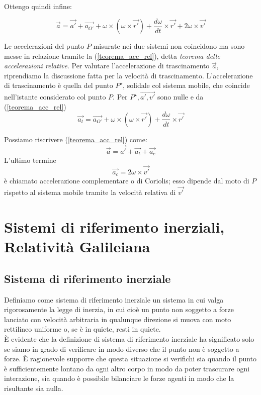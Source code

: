\documentclass[class=book, crop=false, oneside, 12pt]{standalone}
\begin{document}
Ottengo quindi infine:

\begin{equation}
    \overrightarrow{a} = \overrightarrow{a'} + \overrightarrow{a_{O'}} + \omega \times ( \omega \times \overrightarrow{r'}) + \frac{d \omega}{dt} \times \overrightarrow{r'} + 2 \omega \times \overrightarrow{v'}
\end{equation}

Le accelerazioni del punto \(P\) misurate nei due sistemi non coincidono ma sono messe in relazione tramite la (\ref{teorema_acc_rel}), detta \emph{teorema delle accelerazioni relative}.
Per valutare l'accelerazione di trascinamento \(\overrightarrow{a}\), riprendiamo la discussione fatta per la velocità di trascinamento. 
L'accelerazione di trascinamento è quella del punto \(P^{\star}\), solidale col sistema mobile, che coincide nell'istante considerato col punto \(P\). 
Per \(P^{\star}, \overrightarrow{a', v'}\) sono nulle e da (\ref{teorema_acc_rel})
\begin{equation}
    \overrightarrow{a_t} = \overrightarrow{a_{O'}} + \omega \times (\omega \times \overrightarrow{r'}) + \frac{d \omega }{dt} \times \overrightarrow{r'}
\end{equation}

Possiamo riscrivere (\ref{teorema_acc_rel}) come:
\begin{equation}  \label{teorema_acc_cor}
    \overrightarrow{a} = \overrightarrow{a'} + \overrightarrow{a_t} + \overrightarrow{a_c}
\end{equation}
L'ultimo termine
\begin{equation}
    \overrightarrow{a_c} = 2 \omega \times \overrightarrow{v'}
\end{equation}
è chiamato accelerazione complementare o di Coriolis; esso dipende dal moto di \(P\) rispetto al sistema mobile tramite la velocità relativa di \(\overrightarrow{v'}\)

\section{Sistemi di riferimento inerziali, Relatività Galileiana}

\subsection{Sistema di riferimento inerziale}

Definiamo come sistema di riferimento inerziale un sistema in cui valga rigorosamente la legge di inerzia, in cui cioè un punto non soggetto a forze lanciato con velocità arbitraria in qualunque direzione si muova con moto rettilineo uniforme o, se è in quiete, resti in quiete.\\
È evidente che la definizione di sistema di riferimento inerziale ha significato solo se siamo in grado di verificare in modo diverso che il punto non è soggetto a forze. 
È ragionevole supporre che questa situazione si verifichi sia quando il punto è sufficientemente lontano da ogni altro corpo in modo da poter trascurare  ogni interazione, sia quando è possibile bilanciare le forze agenti in modo che la risultante sia nulla.
\end{document}
